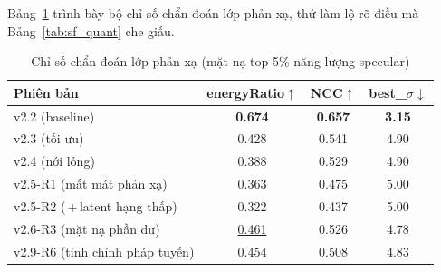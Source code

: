     Bảng~\ref{tab:sf_spec} trình bày bộ chỉ số chẩn đoán lớp phản xạ, thứ làm lộ rõ
    điều mà Bảng~\ref{tab:sf_quant} che giấu.

    \begin{table}[h]
    \centering
    \caption{Chỉ số chẩn đoán lớp phản xạ (mặt nạ top-5\% năng lượng specular)}
    \label{tab:sf_spec}
    \vspace{0.2cm}
    \begin{tabular}{@{}lccc@{}}
    \toprule
    \textbf{Phiên bản} & \textbf{energyRatio}$\uparrow$ & \textbf{NCC}$\uparrow$ & \textbf{best\_$\sigma$}$\downarrow$ \\ \midrule
    v2.2 (baseline) & \textbf{0.674} & \textbf{0.657} & \textbf{3.15} \\
    v2.3 (tối ưu)   & 0.428 & 0.541 & 4.90 \\
    v2.4 (nới lỏng) & 0.388 & 0.529 & 4.90 \\
    v2.5-R1 (mất mát phản xạ) & 0.363 & 0.475 & 5.00 \\
    v2.5-R2 (\,+\,latent hạng thấp) & 0.322 & 0.437 & 5.00 \\
    v2.6-R3 (mặt nạ phần dư) & \underline{0.461} & 0.526 & 4.78 \\
    v2.9-R6 (tinh chỉnh pháp tuyến) & 0.454 & 0.508 & 4.83 \\
    \bottomrule
    \end{tabular}
    \end{table}

